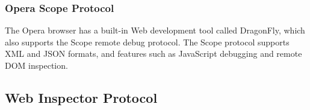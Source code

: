 \subsubsection{Opera Scope Protocol}
The Opera browser has a built-in Web development tool called DragonFly,
which also supports the Scope remote debug protocol. The Scope protocol supports
XML and JSON formats, and features such as JavaScript debugging and remote DOM
inspection.
\subsection{Web Inspector Protocol}
\cite{opera-scope}

